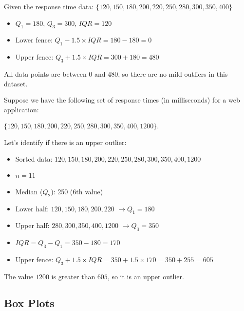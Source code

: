 \begin{example}\par

Given the response time data: $\{120, 150, 180, 200, 220, 250, 280, 300, 350, 400\}$

\begin{itemize}
    \item $Q_1 = 180$, $Q_3 = 300$, $IQR = 120$
    \item Lower fence: $Q_1 - 1.5 \times IQR = 180 - 180 = 0$
    \item Upper fence: $Q_3 + 1.5 \times IQR = 300 + 180 = 480$
\end{itemize}

All data points are between 0 and 480, so there are no mild outliers in this dataset.

\end{example}

\newpage

\begin{example}

Suppose we have the following set of response times (in milliseconds) for a web application:

$\{120, 150, 180, 200, 220, 250, 280, 300, 350, 400, 1200\}$.

Let's identify if there is an upper outlier:

\begin{itemize}
    \item Sorted data: $120, 150, 180, 200, 220, 250, 280, 300, 350, 400, 1200$
    \item $n = 11$
    \item Median ($Q_2$): 250 (6th value)
    \item Lower half: $120, 150, 180, 200, 220$ $\rightarrow Q_1 = 180$
    \item Upper half: $280, 300, 350, 400, 1200$ $\rightarrow Q_3 = 350$
    \item $IQR = Q_3 - Q_1 = 350 - 180 = 170$
    \item Upper fence: $Q_3 + 1.5 \times IQR = 350 + 1.5 \times 170 = 350 + 255 = 605$
\end{itemize}

The value $1200$ is greater than $605$, so it is an upper outlier.

\end{example}

\subsection*{Box Plots}

